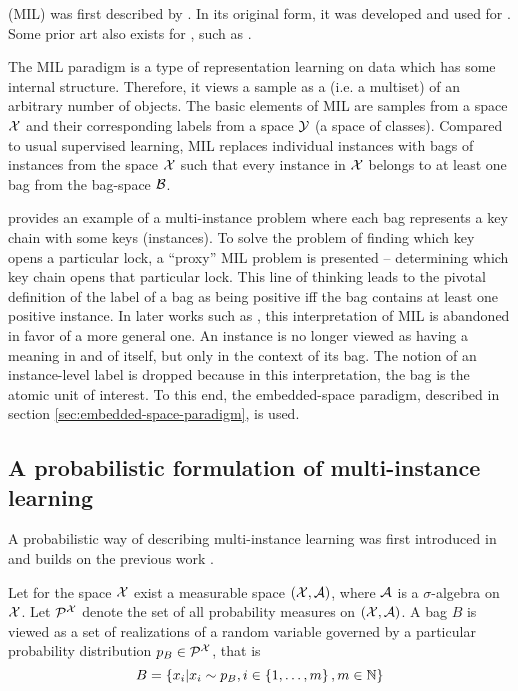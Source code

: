  (MIL) was first described by \cite{dietterich_solving_1997}. In its original form, it was developed and used for . Some prior art also exists for , such as \cite{chen_contextual_2012}.

The MIL paradigm is a type of representation learning on data which has some internal structure. Therefore, it views a sample as a  (i.e. a multiset) of an arbitrary number of objects. The basic elements of MIL are samples from a space \( \mathcal{X} \) and their corresponding labels from a space \( \mathcal{Y} \) (a space of classes). Compared to usual supervised learning, MIL replaces individual instances with bags of instances from the space \( \mathcal{X} \) such that every instance in \( \mathcal{X} \) belongs to at least one bag from the bag-space \( \mathcal{B} \).

\cite{dietterich_solving_1997} provides an example of a multi-instance problem where each bag represents a key chain with some keys (instances). To solve the problem of finding which key opens a particular lock, a \enquote{proxy} MIL problem is presented -- determining which key chain opens that particular lock. This line of thinking leads to the pivotal definition of the label of a bag as being positive iff the bag contains at least one positive instance. In later works such as \cite{pevny_using_2017}, this interpretation of MIL is abandoned in favor of a more general one. An instance is no longer viewed as having a meaning in and of itself, but only in the context of its bag. The notion of an instance-level label is dropped because in this interpretation, the bag is the atomic unit of interest. To this end, the embedded-space paradigm, described in section \ref{sec:embedded-space-paradigm}, is used.

\subsection{A probabilistic formulation of multi-instance learning}\label{sec:probabilistic-formalism}
A probabilistic way of describing multi-instance learning was first introduced in \cite{pevny_using_2017} and builds on the previous work \cite{muandet_learning_2012}.

Let for the space \( \mathcal{X} \) exist a measurable space \( \left( \mathcal{X}, \mathcal{A} \right) \), where \( \mathcal{A} \) is a \( \sigma \)-algebra on \( \mathcal{X} \). Let \( \mathcal{P}^\mathspace{X} \) denote the set of all probability measures on \( \left( \mathcal{X}, \mathcal{A} \right) \). A bag \( B \) is viewed as a set of realizations of a random variable governed by a particular probability distribution \( p_B \in \mathcal{P}^\mathspace{X} \), that is
\[ B = \left\{ x_i \middle| x_i \sim p_B, i \in \left\{ 1, \dots, m \right\}, m \in \mathbb{N} \right\} \]

